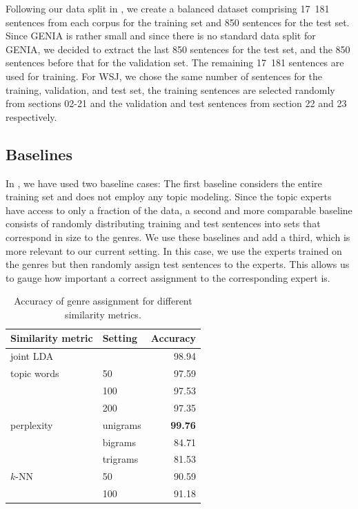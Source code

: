 Following our data split in , we create a balanced dataset comprising 17~181 sentences from each corpus for the training set and 850 sentences for the test set. Since GENIA is rather small and since there is no standard data split for GENIA, we decided to extract the last 850 sentences for the test set, and the 850 sentences before that for the validation set. The remaining 17~181 sentences are used for training. For WSJ, we chose the same number of sentences for the training, validation,  and test set, the training sentences are selected randomly from sections 02-21 and the validation and test sentences from section 22 and 23 respectively.


\subsection{Baselines}

In , we have used two baseline cases: The first baseline considers the entire training set and does not employ any topic modeling. Since the topic experts have access to only a fraction of the data, a second and more comparable baseline consists of  randomly distributing  training and test sentences into sets that correspond in size to the genres. We use these baselines and add a third, which is more relevant to our current setting. In this case, we use the experts trained on the genres but then randomly assign test sentences to the experts. This allows us to gauge how important a correct assignment to the corresponding expert is. 

\begin{table}[t!]
\centering
\begin{tabular}{l|l|r|}
Similarity metric & Setting & Accuracy \\ \hline
joint LDA & & 98.94 \\ \hline
topic words & 50 & 97.59 \\ 
 & 100 & 97.53 \\ 
 & 200 & 97.35 \\ \hline
perplexity & unigrams & \textbf{99.76} \\ 
 & bigrams & 84.71 \\  
 & trigrams & 81.53 \\ \hline
$k$-NN & 50 & 90.59 \\ 
 & 100 & 91.18 \\ \hline
\end{tabular}
\caption{Accuracy of genre assignment for different similarity metrics.}
\label{tab:acc:class:simmetr}
\end{table}


